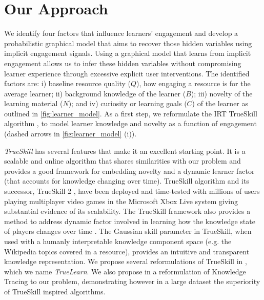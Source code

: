 \documentclass[letterpaper]{article} %
\begin{document}
\section{Our Approach}
We identify four factors that influence learners' engagement and develop a probabilistic graphical model that aims to recover those hidden variables using implicit engagement signals. Using a graphical model that learns from implicit engagement allows us to infer these hidden variables without compromising learner experience through excessive explicit user interventions. The identified factors are: i) baseline resource quality ($Q$), how engaging a resource is for the average learner; ii) background knowledge of the learner ($B$); iii) novelty of the learning material ($N$); and iv) curiosity or learning goals ($C$) of the learner as outlined in \figurename{ \ref{fig:learner_model}}. As a first step, we reformulate the IRT TrueSkill algorithm \cite{trueskill}, to model learner knowledge and novelty as a function of engagement (dashed arrows in \figurename{ \ref{fig:learner_model} (i)}).

\emph{TrueSkill} has several features that make it an excellent starting point. It is a scalable and online algorithm that shares similarities with our problem and provides a good framework for embedding novelty and a dynamic learner factor (that accounts for knowledge changing over time). TrueSkill algorithm and its successor, TrueSkill 2 \cite{trueskill2}, have been deployed and time-tested with millions of users playing multiplayer video games in the Microsoft Xbox Live system giving substantial evidence of its scalability. The TrueSkill framework also provides a method to address dynamic factor involved in learning how the knowledge state of players changes over time \cite{NIPS2007_3331}. The Gaussian skill parameter in TrueSkill, when used with a humanly interpretable knowledge component space (e.g. the Wikipedia topics covered in a resource), provides an intuitive and transparent knowledge representation. We propose several reformulations of TrueSkill in \cite{Bulathwela2020}, which we name \emph{TrueLearn}. We also propose in \cite{Bulathwela2020} a reformulation of Knowledge Tracing to our problem, demonstrating however in a large dataset the superiority of TrueSkill inspired algorithms.

\end{document}
